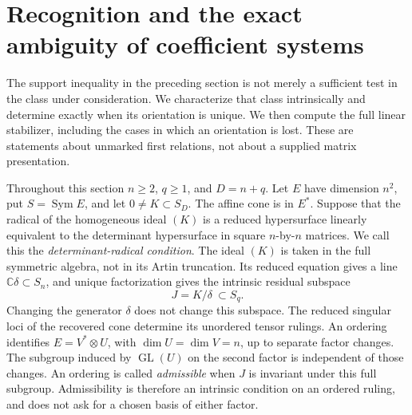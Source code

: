 \documentclass[11pt,reqno]{amsart}
\numberwithin{equation}{section}
\theoremstyle{definition}\newtheorem{definition}[theorem]{Definition}
\theoremstyle{remark}\newtheorem{remark}[theorem]{Remark}
\newcommand{\C}{\mathbb C}\newcommand{\Q}{\mathbb Q}
\DeclareMathOperator{\Sym}{Sym}\DeclareMathOperator{\Gr}{Gr}
\begin{document}

\section{Recognition and the exact ambiguity of coefficient systems}
\label{sec:coefficient-symmetries-v148}

The support inequality in the preceding section is not merely a
sufficient test in the class under consideration.  We characterize
that class intrinsically and determine exactly when its orientation
is unique.  We then compute the full linear stabilizer, including
the cases in which an orientation is lost.  These are statements
about unmarked first relations, not about a supplied matrix
presentation.

Throughout this section \(n\ge2\), \(q\ge1\), and \(D=n+q\).
Let \(E\) have dimension \(n^2\), put \(S=\Sym E\), and let
\(0\ne K\subset S_D\).  The affine cone is in \(E^*\).
Suppose that the radical of the homogeneous ideal \((K)\) is a
reduced hypersurface linearly equivalent to the determinant
hypersurface in square \(n\)-by-\(n\) matrices.  We call this the
\emph{determinant-radical condition}.  The ideal \((K)\) is taken
in the full symmetric algebra, not in its Artin truncation.
Its reduced equation gives a line \(\C\delta\subset S_n\),
and unique factorization gives the intrinsic residual subspace
\begin{equation}\label{eq:residual-recognition-v148}
                   J=K/\delta\ \subset S_q.
\end{equation}
Changing the generator \(\delta\) does not change this subspace.
The reduced singular loci of the recovered cone determine its
unordered tensor rulings.  An ordering identifies
\(E=V^*\otimes U\), with \(\dim U=\dim V=n\), up to
separate factor changes.  The subgroup induced by
\(\operatorname{GL}(U)\) on the second factor is independent of
those changes.  An ordering is called \emph{admissible} when
\(J\) is invariant under this full subgroup.  Admissibility is
therefore an intrinsic condition on an ordered ruling, and does
not ask for a chosen basis of either factor.
\end{document}
